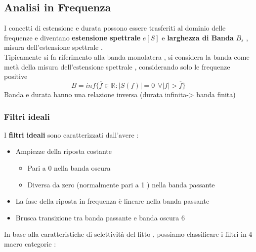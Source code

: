 \documentclass{article}
\theoremstyle{definition}
\newcommand{\R}{\mathbb{R}}
\begin{document}
\subsection{Analisi in Frequenza}
I concetti di estensione e durata possono essere trasferiti al dominio delle frequenze e diventano \textbf{estensione spettrale } $e[S]$ e \textbf{larghezza di Banda }$B_s$ , misura dell'estensione spettrale .\\ Tipicamente si fa riferimento alla banda monolatera , si considera la banda come metà della misura dell'estensione spettrale , considerando solo le frequenze positive  $$B=inf \{\overline{f}\in \R : |S(f)|=0\ \  \forall |f|> \overline{f}\}$$
Banda e durata hanno una relazione inversa (durata infinita-> banda finita)
\subsubsection{Filtri ideali}
I \textbf{filtri ideali} sono caratterizzati dall'avere :
\begin{itemize}
	\item Ampiezze della riposta costante 
	\begin{itemize}
	\item Pari a 0 nella banda oscura 
	\item Diversa da zero (normalmente pari a 1 ) nella banda passante 
	\end{itemize}
	\item La fase della riposta in frequenza è lineare nella banda passante 
	\item Brusca transizione tra banda passante e banda oscura 6
\end{itemize}
In base alla caratteristiche di selettività del fitto , possiamo classificare i filtri in 4 macro categorie : 
\end{document}

